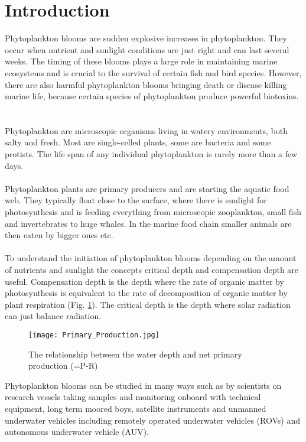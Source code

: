 \documentclass[../Main.tex]{subfiles}
\begin{document}
\section*{\crule[blue]{.3cm}{.3cm} Introduction}
Phytoplankton blooms are sudden explosive increases in phytoplankton. 
They occur when nutrient and sunlight conditions are just right and can last several weeks. 
The timing of these blooms plays a large role in maintaining marine ecosystems and is crucial to the survival of certain fish and bird species. 
However, there are also harmful phytoplankton blooms bringing death or disease killing marine life, because certain species of phytoplankton produce powerful biotoxins.
\ \\ \ \\
Phytoplankton are microscopic organisms living in watery environments, both salty and fresh. 
Most are single-celled plants, some are bacteria and some protists. 
The life span of any individual phytoplankton is rarely more than a few days.
\ \\ \ \\
Phytoplankton plants are primary producers and are starting the aquatic food web.
They typically float close to the surface, where there is sunlight for photosynthesis and is feeding everything from microscopic zooplankton, small fish and invertebrates to huge whales. In the marine food chain smaller animals are then eaten by bigger ones etc. \supercite{Prim2021}
\ \\ \ \\
To understand the initiation of phytoplankton blooms depending on the amount of nutrients and sunlight the concepts critical depth and compensation depth are useful. 
Compensation depth is the depth where the rate of organic matter by photosynthesis is equivalent to the rate of decomposition of organic matter by plant respiration (Fig. \ref{fig:prim}).
The critical depth is the depth where solar radiation can just balance radiation.\supercite{Sverdrup1953OnCF}
\begin{figure}[H]
\texttt{[image: Primary\_Production.jpg]}
\caption{The relationship between the water depth and net primary production (=P-R) \supercite{Nasa2021}}
\label{fig:prim}
\end{figure}
Phytoplankton blooms can be studied in many ways such as by scientists on research vessels taking samples and monitoring onboard with technical equipment, long term moored boys, satellite instruments and unmanned underwater vehicles including remotely operated underwater vehicles (ROVs) and autonomous underwater vehicle (AUV). 
\end{document}
